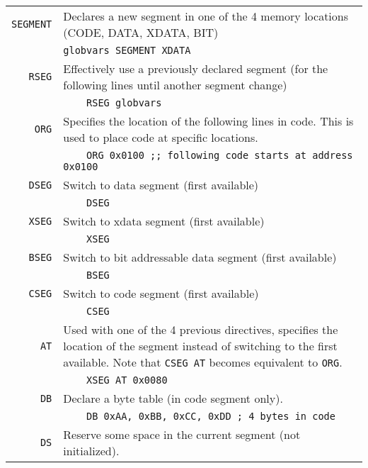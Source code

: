 \documentclass{article}
\begin{document}
\noindent
\begin{tabularx}{\textwidth}{rX}
  \texttt{SEGMENT}&Declares a new segment in one of the 4 memory
  locations (CODE, DATA, XDATA, BIT)\\
  &\texttt{globvars SEGMENT XDATA}\\
  \noalign{\smallskip}
  \hline
  \noalign{\smallskip}
  \texttt{RSEG}&Effectively use a previously declared segment (for the
  following lines until another segment change)\\
  &\texttt{\ \ \ \ RSEG globvars}\\
  \noalign{\smallskip}
  \hline
  \noalign{\smallskip}
  \texttt{ORG}&Specifies the location of the following lines in
  code. This is used to place code at specific locations.\\
  &\texttt{\ \ \ \ ORG 0x0100 ;; following code starts at address 0x0100}\\
  \noalign{\smallskip}
  \hline
  \noalign{\smallskip}
  \texttt{DSEG}&Switch to data segment (first available)\\
  &\texttt{\ \ \ \ DSEG}\\
  \noalign{\smallskip}
  \hline
  \noalign{\smallskip}
  \texttt{XSEG}&Switch to xdata segment (first available)\\
  &\texttt{\ \ \ \ XSEG}\\
  \noalign{\smallskip}
  \hline
  \noalign{\smallskip}
  \texttt{BSEG}&Switch to bit addressable data segment (first available)\\
  &\texttt{\ \ \ \ BSEG}\\
  \noalign{\smallskip}
  \hline
  \noalign{\smallskip}
  \texttt{CSEG}&Switch to code segment (first available)\\
  &\texttt{\ \ \ \ CSEG}\\
  \noalign{\smallskip}
  \hline
  \noalign{\smallskip}
  \texttt{AT}&Used with one of the 4 previous directives, specifies
  the location of the segment instead of switching to the first
  available. Note that \texttt{CSEG AT} becomes equivalent to \texttt{ORG}.\\
  &\texttt{\ \ \ \ XSEG AT 0x0080}\\
  \noalign{\smallskip}
  \hline
  \noalign{\smallskip}
  \texttt{DB}&Declare a byte table (in code segment only).\\
  &\texttt{\ \ \ \ DB 0xAA, 0xBB, 0xCC, 0xDD ; 4 bytes in code}\\
  \noalign{\smallskip}
  \hline
  \noalign{\smallskip}
  \texttt{DS}&Reserve some space in the current segment (not initialized).\\

\end{tabularx}
\end{document}
